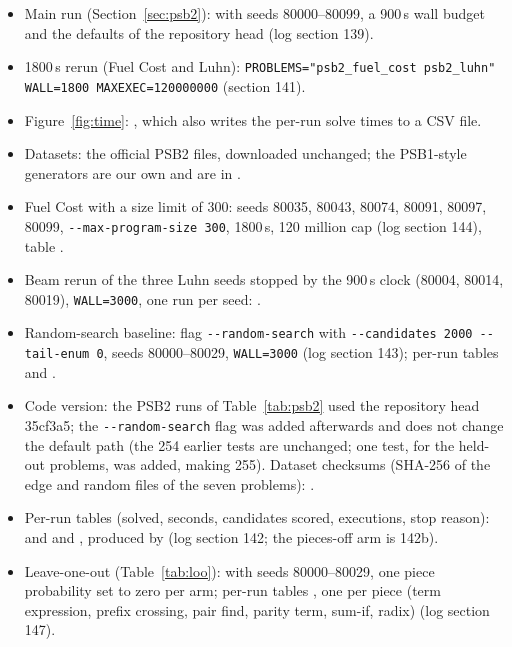 \documentclass[sigconf,nonacm]{acmart}
\begin{document}
\begin{itemize}
  \item Main run (Section~\ref{sec:psb2}):  with seeds 80000--80099, a 900\,s wall budget and the defaults of the repository head
  (log section 139).
  \item 1800\,s rerun (Fuel Cost and Luhn): \texttt{PROBLEMS="psb2\_fuel\_cost psb2\_luhn" WALL=1800 MAXEXEC=120000000} (section 141).
  \item Figure~\ref{fig:time}: , which also writes the per-run solve times to a CSV file.
  \item Datasets: the official PSB2 files, downloaded unchanged; the PSB1-style generators are our own and are in .
  \item Fuel Cost with a size limit of 300: seeds 80035, 80043, 80074, 80091, 80097, 80099, \texttt{-{}-max-program-size 300}, 1800\,s, 120 million cap (log section 144), table .
  \item Beam rerun of the three Luhn seeds stopped by the 900\,s clock (80004, 80014, 80019), \texttt{WALL=3000}, one run per seed: .
  \item Random-search baseline: flag \texttt{-{}-random-search} with \texttt{-{}-candidates 2000 -{}-tail-enum 0}, seeds 80000--80029, \texttt{WALL=3000} (log section 143); per-run tables  and .
  \item Code version: the PSB2 runs of Table~\ref{tab:psb2} used the repository head 35cf3a5; the \texttt{-{}-random-search} flag was added afterwards and does not change the default path (the 254 earlier tests are unchanged; one test, for the held-out problems, was added, making 255). Dataset checksums (SHA-256 of the edge and random files of the seven problems): .
  \item Per-run tables (solved, seconds, candidates scored, executions, stop reason):  and  and , produced by  (log section 142; the pieces-off arm is 142b).
  \item Leave-one-out (Table~\ref{tab:loo}):  with seeds 80000--80029, one piece probability set to zero per arm; per-run tables , one per piece (term expression, prefix crossing, pair find, parity term, sum-if, radix) (log section 147).

\end{itemize}
\end{document}
